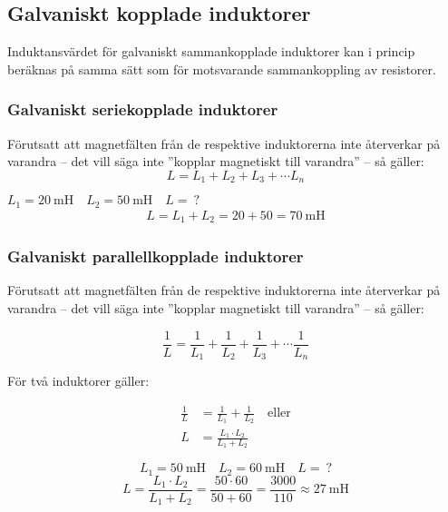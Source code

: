 \subsection{Galvaniskt kopplade induktorer}
\label{galvaniskt_kopplade_induktorer}

Induktansvärdet för galvaniskt sammankopplade induktorer kan i princip
beräknas på samma sätt som för motsvarande sammankoppling av resistorer.

\subsubsection{Galvaniskt seriekopplade induktorer}

Förutsatt att magnetfälten från de respektive induktorerna inte återverkar på
varandra -- det vill säga inte ''kopplar magnetiskt till varandra'' -- så
gäller:
%
\[L = L_1 + L_2 + L_3 + \cdots L_n\]
%

\begin{exempelbox}
\(L_1 = \qty{20}{\milli\henry} \quad L_2 = \qty{50}{\milli\henry} \quad L =\ ?\)
\tcblower
\begin{align*}
  L = L_1 + L_2 = 20 + 50 = \qty{70}{\milli\henry}
\end{align*}
\end{exempelbox}

\subsubsection{Galvaniskt parallellkopplade induktorer}

Förutsatt att magnetfälten från de respektive induktorerna inte återverkar på
varandra -- det vill säga inte ''kopplar magnetiskt till varandra'' -- så
gäller:

\[
\frac{1}{L} = \frac{1}{L_1} + \frac{1}{L_2} + \frac{1}{L_3} +
\cdots \frac{1}{L_n}
\]

För två induktorer gäller:

\begin{align*}
  \frac{1}{L} &= \frac{1}{L_1} + \frac{1}{L_2} \quad \text{eller} \\
  L &= \frac{L_1 \cdot L_2}{L_1 + L_2}
\end{align*}

\begin{exempelbox}
\[L_1 = \qty{50}{\milli\henry} \quad L_2 = \qty{60}{\milli\henry} \quad L =\ ?\]
\tcblower
\[
  L = \frac{L_1 \cdot L_2}{L_1 + L_2}
  = \frac{50 \cdot 60}{50 + 60}
  = \frac{3000}{110}
  \approx \qty{27}{\milli\henry}
\]
\end{exempelbox}

